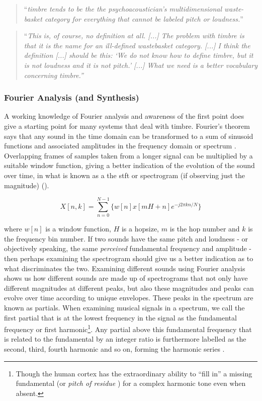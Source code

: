 {{\blockcquote[]{McAdams1979}{``\textit{timbre tends to be the the psychoacoustician's multidimensional waste-basket category for everything that cannot be labeled pitch or loudness.}''} 

\blockcquote[]{Bregman1994}{``\textit{This is, of course, no definition at all. [...] The problem with timbre is that it is the name for an ill-defined wastebasket category. [...] I think the definition [...] should be this: ‘We do not know how to define timbre, but it is not loudness and it is not pitch.’ [...] What we need is a better vocabulary concerning timbre.''}}

\subsubsection{Fourier Analysis (and Synthesis)}

A working knowledge of Fourier analysis and awareness of the first point does give a starting point for many systems that deal with timbre. Fourier's theorem says that any sound in the time domain can be transformed to a sum of sinusoid functions and associated amplitudes in the frequency domain or spectrum \citep{Roads1996}. Overlapping frames of samples taken from a longer signal can be multiplied by a suitable window function, giving a better indication of the evolution of the sound over time, in what is known as a the \acrshort{stft} or spectrogram (if observing just the magnitude) \citep{Collins2010}().

\begin{equation}
\label{eq:stft}
X[n,k] = \sum_{n=0}^{N-1}\{w[n]x[mH+n]e^{-j2\pi kn/N}\}
\end{equation}

where $w[n]$ is a window function, $H$ is a hopsize, $m$ is the hop number and $k$ is the frequency bin number. If two sounds have the same pitch and loudness - or objectively speaking, the same \textit{perceived} fundamental frequency and amplitude - then perhaps examining the spectrogram should give us a better indication as to what discriminates the two. Examining different sounds using Fourier analysis shows us how different sounds are made up of spectrograms that not only have different magnitudes at different peaks, but also these magnitudes and peaks can evolve over time according to unique envelopes. These peaks in the spectrum are known as partials. When examining musical signals in a spectrum, we call the first partial that is at the lowest frequency in the signal as the fundamental frequency or first harmonic\footnote{Though the human cortex has the extraordinary ability to ``fill in'' a missing fundamental (or \textit{pitch of residue} \citep{Weihs2009}) for a complex harmonic tone even when absent.}. Any partial above this fundamental frequency that is related to the fundamental by an integer ratio is furthermore labelled as the second, third, fourth harmonic and so on, forming the harmonic series \citep{Puckette2006}.

}}
